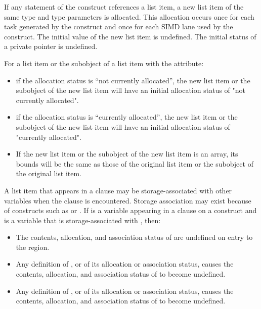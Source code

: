 {{{{\fortranspecificstart 
If any statement of the construct references a list item, a new list
item of the same type and type parameters is allocated. This
allocation occurs once for each task generated by the construct and
once for each SIMD lane used by the construct. The initial value of
the new list item is undefined. The initial status of a private
pointer is undefined.

For a list item or the subobject of a list item with the  attribute:

\begin{itemize}
\item if the allocation status is ``not currently allocated'', the new list item or the subobject 
of the new list item will have an initial allocation status of "not currently allocated".

\item if the allocation status is ``currently allocated'', the new list item or the subobject of 
the new list item will have an initial allocation status of "currently allocated".

\item If the new list item or the subobject of the new list item is an array, its bounds will be 
the same as those of the original list item or the subobject of the original list item.
\end{itemize}

A list item that appears in a  clause may be storage-associated with other 
variables when the  clause is encountered. Storage association may exist 
because of constructs such as  or . If  is a variable appearing 
in a  clause on a construct and  is a variable that is storage-associated with , then:

\begin{itemize}
\item The contents, allocation, and association status of  are undefined on entry to the region.

\item Any definition of , or of its allocation or association status, causes the contents, 
allocation, and association status of  to become undefined. 

\item Any definition of , or of its allocation or association status, causes the contents, 
allocation, and association status of  to become undefined. 
\end{itemize}

}}}}
